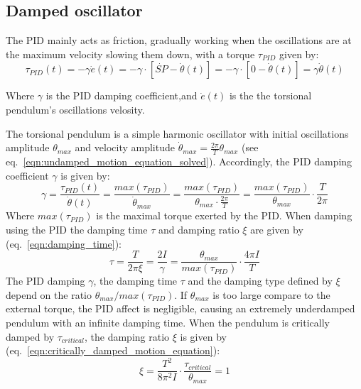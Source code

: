\documentclass[\main/master.tex]{subfiles}
\begin{document}
\subsection{Damped oscillator}
The PID mainly acts as friction, gradually working when the oscillations are at the maximum velocity slowing them down, with a torque $\tau_{PID}$ given by:
\begin{equation}
\tau_{PID}(t) = -\gamma\dot{e}(t) =  -\gamma\cdot [\dot{SP} -\dot{\theta}(t)] =-\gamma\cdot [0-\dot{\theta}(t)]  =  \gamma\dot{\theta}(t)  
\label{eqn:friction_torque_pid}
\end{equation}
\par\noindent
Where $\gamma$ is the PID damping coefficient,and $\dot{e}(t)$ is the the torsional pendulum's oscillations velosity. 
\par\noindent
The torsional pendulum is a simple harmonic oscillator with initial oscillations amplitude $\theta_{max}$ and velocity amplitude $\dot{\theta}_{max} =\frac{2\pi}{T} \theta_{max}$ (see eq.~\ref{eqn:undamped_motion_equation_solved}). Accordingly, the PID damping coefficient $\gamma$ is given by:
\begin{equation}
\gamma  =  \frac{\tau_{PID}(t)}{\dot{\theta}(t)} = \frac{max(\tau_{PID})}{\dot{\theta}_{max}} =  \frac{max(\tau_{PID})}{\theta_{max}\cdot\frac{2\pi}{T}} =\frac{max(\tau_{PID})}{\theta_{max}}\cdot \frac{ T}{2\pi}          \label{eqn:damped_pid_motion_equation_2}
\end{equation}
Where $max(\tau_{PID})$ is the maximal torque exerted by the PID. When damping using the PID the damping time $\tau$ and damping ratio $\xi$ are given by (eq.~\ref{eqn:damping_time}):
\begin{equation}
\tau = \frac{T}{2 \pi \xi } =  \frac{2I}{\gamma} = \frac{\theta_{max}}{ max(\tau_{PID})} \cdot \frac{4\pi I}{T}  \label{eqn:damping_time_pid}
\end{equation}
The PID damping $\gamma$, the damping time $\tau$ and the damping type defined by $\xi$ depend on the ratio $\theta_{max}/max(\tau_{PID})$. If $\theta_{max}$ is too large compare to the external torque, the PID affect is negligible, causing an extremely underdamped pendulum with an infinite damping time. When the pendulum is critically damped  by $\tau_{critical}$, the damping ratio $\xi$ is given by (eq.~\ref{eqn:critically_damped_motion_equation}):
\begin{equation}
\xi = \frac{T^2}{ 8 \pi^2 I }\cdot\frac{ \tau_{critical}}{\theta_{max}} = 1 
\label{eqn:damping_ratio_pid}
\end{equation}
\end{document}
